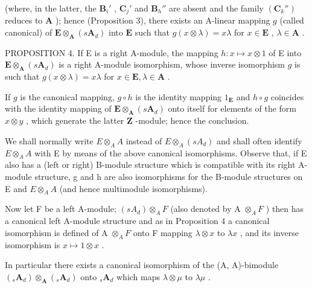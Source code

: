 (where, in the latter, the \(\mathbf{B}_i'\) , \(\mathbf{C}_j'\) and \(\mathbf{B}_h''\) are absent and the family \((\mathbf{C}_k'')\) reduces to \(\mathbf{A}\) ); hence (Proposition 3), there exists an A-linear mapping \(g\) (called canonical) of \(\mathbf{E} \otimes_{\mathbf{A}} (s\mathbf{A}_d)\) into \(\mathbf{E}\) such that \(g(x \otimes \lambda) = x\lambda\) for \(x \in \mathbf{E}\) , \(\lambda \in \mathbf{A}\) .

PROPOSITION 4. If E is a right A-module, the mapping \(h: x \mapsto x \otimes 1\) of E into \(\mathbf{E} \otimes_{\mathbf{A}} (s\mathbf{A}_d)\) is a right A-module isomorphism, whose inverse isomorphism \(g\) is such that \(g(x \otimes \lambda) = x\lambda\) for \(x \in \mathbf{E}, \lambda \in \mathbf{A}\) .

If \(g\) is the canonical mapping, \(g \circ h\) is the identity mapping \(1_{\mathbf{E}}\) and \(h \circ g\) coincides with the identity mapping of \(\mathbf{E} \otimes_{\mathbf{A}} (s\mathbf{A}_d)\) onto itself for elements of the form \(x \otimes y\) , which generate the latter \(\mathbf{Z}\) -module; hence the conclusion.

We shall normally write \(E \otimes_{A} A\) instead of \(E \otimes_{A} (s A_{d})\) and shall often identify \(E \otimes_{A} A\) with E by means of the above canonical isomorphisms. Observe that, if E also has a (left or right) B-module structure which is compatible with its right A-module structure, g and h are also isomorphisms for the B-module structures on E and \(E \otimes_{A} A\) (and hence multimodule isomorphisms).

Now let F be a left A-module; \((sA_{d}) \otimes_{A} F\) (also denoted by A \(\otimes_{A} F\) ) then has a canonical left A-module structure and as in Proposition 4 a canonical isomorphism is defined of A \(\otimes_{A} F\) onto F mapping \(\lambda \otimes x\) to \(\lambda x\) , and its inverse isomorphism is \(x \mapsto 1 \otimes x\) .

In particular there exists a canonical isomorphism of the (A, A)-bimodule \((_{s}\mathbf{A}_{d})\otimes_{\mathbf{A}}(_{s}\mathbf{A}_{d})\) onto \({}_{s}\mathbf{A}_{d}\) which maps \(\lambda \otimes \mu\) to \(\lambda \mu\) .

